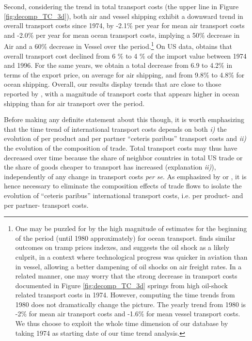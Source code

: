 \documentclass[a4paper,11pt]{article}
\begin{document}
Second, considering the trend in total transport costs (the upper line in Figure \ref{fig:decomp_TC_3d}), both air and vessel shipping exhibit a downward trend in overall transport costs since 1974, by -2.1\% per year for mean air transport costs and -2.0\% per year for mean ocean transport costs, implying a 50\% decrease in Air and a 60\% decrease in Vessel over the period.\footnote{One may be puzzled for by the high magnitude of estimates for the beginning of the period (until 1980 approximately) for ocean transport. \citet{hummels2007} finds similar outcomes on tramp prices indexes, and suggests the oil shock as a likely culprit, in a context where technological progress was quicker in aviation than in vessel, allowing a better dampening of oil shocks on air freight rates. In a related manner, one may worry that the strong decrease in transport costs documented in Figure \ref{fig:decomp_TC_3d} springs from high oil-shock related transport costs in 1974. However, computing the time trends from 1980 does not dramatically change the picture. The yearly trend from 1980 is -2\% for mean air transport costs and -1.6\% for mean vessel transport costs. We thus choose to exploit the whole time dimension of our database by taking 1974 as starting date of our time trend analysis.} On US data, \citet{Hummels_1999} obtains that overall transport cost declined from 6 \% to 4 \% of the import value between 1974 and 1996. For the same years, we obtain a total decrease from 6.9 to 4.2\% in terms of the export price, on average for air shipping, and from 9.8\% to 4.8\% for ocean shipping. Overall, our results display trends that are close to those reported by \citet{Hummels_1999}, with a magnitude of transport costs that appears higher in ocean shipping than for air transport over the period.\smallskip


Before making any definite statement about this though, it is worth emphasizing that the time trend of international transport costs depends on both \textit{i)} the evolution of per product and per partner ``ceteris paribus'' transport costs and \textit{ii)} the evolution of the composition of trade. Total transport costs may thus have decreased over time because the share of neighbor countries in total US trade or the share of goods cheaper to transport has increased (explanation \textit{ii)}), independently of any change in transport costs \textit{per se}. As emphasized by \citet{Hummels_1999} or \cite{hummels2007}, it is hence necessary to eliminate the composition effects of trade flows to isolate the evolution of ``ceteris paribus'' international transport costs, i.e. per product- and per partner- transport costs.
\end{document}
